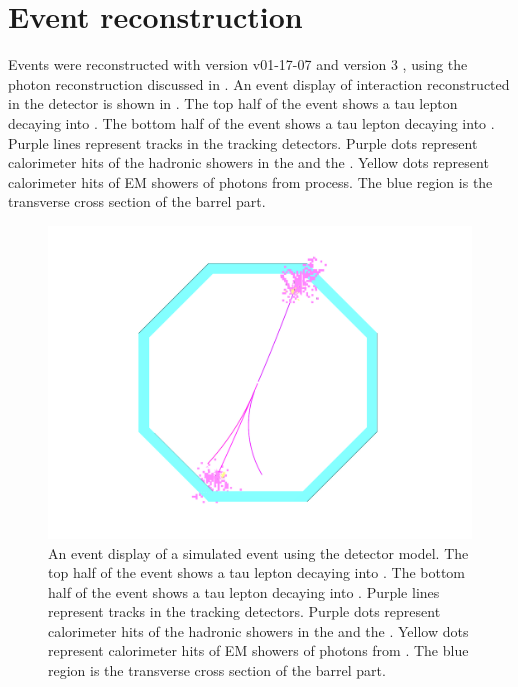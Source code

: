 \section{Event reconstruction}
\label{sec:tauReco}

Events were reconstructed with  \ilcsoft version v01-17-07 \cite{Gaede:82475} and \pandora version 3 \cite{Marshall:2015rfa}, using the photon reconstruction discussed in . An event display of \eeToTauTau interaction reconstructed in the \ILD detector is shown in . The top half of the event shows a tau lepton decaying into \decayRhoFinalState. The bottom half of the event shows a tau lepton decaying into \decayThreePionPhoton. Purple lines represent \Ppipm tracks in the tracking detectors. Purple dots represent  calorimeter hits of the \Ppipm hadronic showers in the \ECAL and the \HCAL. Yellow dots represent calorimeter hits of EM showers of photons  from \HepProcess{\Ppizero \to \Pphoton \Pphoton} process. The blue region is the transverse cross section of the \ECAL barrel part.



\begin{figure}[!tbph]
\centering
\includegraphics[width=1\textwidth]{tau/tau_evt_dsp3}
\caption{ An event display of a simulated \eeToTauTau event using the \ILD detector model. The top half of the event shows a tau lepton decaying into \decayRhoFinalState. The bottom half of the event shows a tau lepton decaying into \decayThreePionPhoton. Purple lines represent \Ppipm tracks in the tracking detectors. Purple dots represent  calorimeter hits of the \Ppipm hadronic showers in the \ECAL and the \HCAL. Yellow dots represent calorimeter hits of EM showers of photons  from \HepProcess{\Ppizero \to \Pphoton \Pphoton}. The blue region is the transverse cross section of the \ECAL barrel part.}
\label{fig:tauEvtDsp}
\end{figure}




